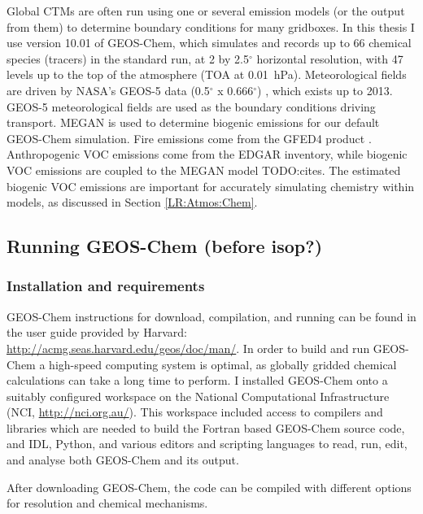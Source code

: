     Global CTMs are often run using one or several emission models (or the output from them) to determine boundary conditions for many gridboxes.
    In this thesis I use version 10.01 of GEOS-Chem, which simulates and records up to 66 chemical species (tracers) in the standard run, at 2 by 2.5$^{\circ}$ horizontal resolution, with 47 levels up to the top of the atmosphere (TOA at 0.01~hPa). 
    Meteorological fields are driven by NASA's GEOS-5 data (0.5$^{\circ}$ x 0.666$^{\circ}$) \parencite{Chen2009}, which exists up to 2013. %
    GEOS-5 meteorological fields are used as the boundary conditions driving transport.
    MEGAN is used to determine biogenic emissions for our default GEOS-Chem simulation.
    Fire emissions come from the GFED4 product \parencite{Giglio2013}. 
    Anthropogenic VOC emissions come from the EDGAR inventory, while biogenic VOC emissions are coupled to the MEGAN model TODO:cites.
    The estimated biogenic VOC emissions are important for accurately simulating chemistry within models, as discussed in Section \ref{LR:Atmos:Chem}.
  
  \subsection{Running GEOS-Chem (before isop?)}
    \label{Model:GC:running}
    \subsubsection{Installation and requirements}
      GEOS-Chem instructions for download, compilation, and running can be found in the user guide provided by Harvard: \url{http://acmg.seas.harvard.edu/geos/doc/man/}.
      In order to build and run GEOS-Chem a high-speed computing system is optimal, as globally gridded chemical calculations can take a long time to perform.
      I installed GEOS-Chem onto a suitably configured workspace on the National Computational Infrastructure (NCI, \url{http://nci.org.au/}). 
      This workspace included access to compilers and libraries which are needed to build the Fortran based GEOS-Chem source code, and IDL, Python, and various editors and scripting languages to read, run, edit, and analyse both GEOS-Chem and its output.
      
      After downloading GEOS-Chem, the code can be compiled with different options for resolution and chemical mechanisms.
  
